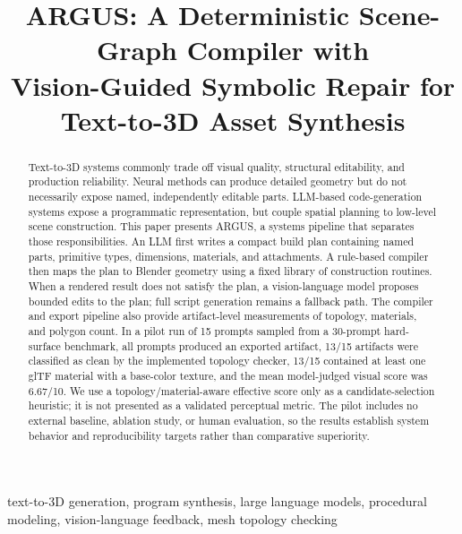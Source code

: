 \documentclass[conference]{IEEEtran}
\begin{document}
\title{ARGUS: A Deterministic Scene-Graph Compiler with\\Vision-Guided Symbolic Repair for Text-to-3D Asset Synthesis}

\author{
}

\maketitle

\begin{abstract}
Text-to-3D systems commonly trade off visual quality, structural editability, and production reliability. Neural methods can produce detailed geometry but do not necessarily expose named, independently editable parts. LLM-based code-generation systems expose a programmatic representation, but couple spatial planning to low-level scene construction. This paper presents ARGUS, a systems pipeline that separates those responsibilities. An LLM first writes a compact build plan containing named parts, primitive types, dimensions, materials, and attachments. A rule-based compiler then maps the plan to Blender geometry using a fixed library of construction routines. When a rendered result does not satisfy the plan, a vision-language model proposes bounded edits to the plan; full script generation remains a fallback path. The compiler and export pipeline also provide artifact-level measurements of topology, materials, and polygon count. In a pilot run of 15 prompts sampled from a 30-prompt hard-surface benchmark, all prompts produced an exported artifact, 13/15 artifacts were classified as clean by the implemented topology checker, 13/15 contained at least one glTF material with a base-color texture, and the mean model-judged visual score was 6.67/10. We use a topology/material-aware effective score only as a candidate-selection heuristic; it is not presented as a validated perceptual metric. The pilot includes no external baseline, ablation study, or human evaluation, so the results establish system behavior and reproducibility targets rather than comparative superiority.
\end{abstract}

\begin{IEEEkeywords}
text-to-3D generation, program synthesis, large language models, procedural modeling, vision-language feedback, mesh topology checking
\end{IEEEkeywords}
\end{document}
